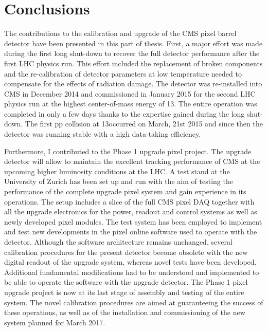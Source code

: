 \chapter{Conclusions}
\label{ch:summary2}

The contributions to the calibration and upgrade of the CMS pixel barrel detector have been presented in this part of thesis.
First, a major effort was made during the first long shut-down to recover the full detector performance after the first LHC physics run.
This effort included the replacement of broken components and the re-calibration of detector parameters at low temperature needed to compensate for the effects of radiation damage.
The detector was re-installed into CMS in December 2014 and commissioned in January 2015 for the second LHC physics run at the highest center-of-mass energy of 13\TeV.
The entire operation was completed in only a few days thanks to the expertise gained during the long shut-down.
The first pp collision at 13\TeV occurred on March, 21st 2015 and since then the detector
was running stable with a high data-taking efficiency.

Furthermore, I contributed to the Phase 1 upgrade pixel project.
The upgrade detector will allow to maintain the excellent tracking performance of CMS at the upcoming higher luminosity conditions at the LHC.
A test stand at the University of Zurich has been set up and run with the aim of testing the performance of the complete upgrade pixel system and gain experience in its operations.
The setup includes a slice of the full CMS pixel DAQ together with all the upgrade electronics for the power, readout and control systems as well as newly developed pixel modules.
The test system has been employed to implement and test new developments in the pixel online software used to operate with the detector.
Although the software architecture remains unchanged, several calibration procedures for the present detector become obsolete with the new digital readout of the upgrade system,
whereas novel tests have been developed. 
Additional fundamental modifications had to be understood and implemented to be able to operate the software with the upgrade detector.
The Phase 1 pixel upgrade project is now at its last stage of assembly and testing of the entire system.
The novel calibration procedures are aimed at guaranteeing the success of these operations, as well as of the installation and commissioning of the new system planned for March 2017.
